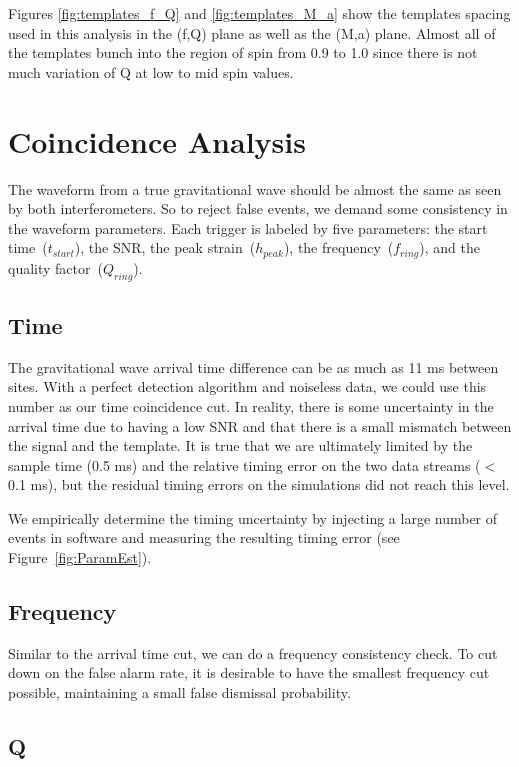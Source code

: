 Figures \ref{fig:templates_f_Q} and \ref{fig:templates_M_a} show the templates
spacing used in this analysis in the (f,Q) plane as well as the (M,a) plane.
Almost all of the templates bunch into the region of spin from 0.9 to 1.0
since there is not much variation of Q at low to mid spin values.

 

\section{Coincidence Analysis}
\label{sec:coin_anal}

The waveform from a true gravitational wave should be almost the same as seen by both
interferometers. So to reject false events, we demand some consistency in the
waveform parameters. Each trigger is labeled by five parameters: the start
time~($t_{start}$), the SNR, the peak strain~($h_{peak}$), the frequency~($f_{ring}$),
and the quality factor~($Q_{ring}$).


\subsection{Time}

The gravitational wave arrival time difference can be as much as
11 ms between sites. With a perfect detection algorithm and noiseless
data, we could use this number as our time coincidence cut. In reality,
there is some uncertainty in the arrival time due to having a low SNR and
that there is a small mismatch between the signal and the template. It is true
that we are ultimately limited by the sample time (0.5 ms) and the relative timing
error on the two data streams ($<$ 0.1 ms), but the residual timing errors
on the simulations did not reach this level.

We empirically determine the timing uncertainty by injecting a large number 
of events in software and measuring the resulting timing error 
(see Figure~\ref{fig:ParamEst}).

\subsection{Frequency}

Similar to the arrival time cut, we can do a frequency consistency check. To cut
down on the false alarm rate, it is desirable to have the smallest
frequency cut possible, maintaining a small false dismissal
probability.

\subsection{Q}

